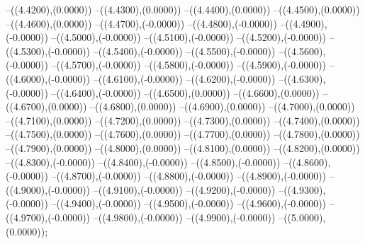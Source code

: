 {	--({\sx*(4.4200)},{\sy*(0.0000)})
	--({\sx*(4.4300)},{\sy*(0.0000)})
	--({\sx*(4.4400)},{\sy*(0.0000)})
	--({\sx*(4.4500)},{\sy*(0.0000)})
	--({\sx*(4.4600)},{\sy*(0.0000)})
	--({\sx*(4.4700)},{\sy*(-0.0000)})
	--({\sx*(4.4800)},{\sy*(-0.0000)})
	--({\sx*(4.4900)},{\sy*(-0.0000)})
	--({\sx*(4.5000)},{\sy*(-0.0000)})
	--({\sx*(4.5100)},{\sy*(-0.0000)})
	--({\sx*(4.5200)},{\sy*(-0.0000)})
	--({\sx*(4.5300)},{\sy*(-0.0000)})
	--({\sx*(4.5400)},{\sy*(-0.0000)})
	--({\sx*(4.5500)},{\sy*(-0.0000)})
	--({\sx*(4.5600)},{\sy*(-0.0000)})
	--({\sx*(4.5700)},{\sy*(-0.0000)})
	--({\sx*(4.5800)},{\sy*(-0.0000)})
	--({\sx*(4.5900)},{\sy*(-0.0000)})
	--({\sx*(4.6000)},{\sy*(-0.0000)})
	--({\sx*(4.6100)},{\sy*(-0.0000)})
	--({\sx*(4.6200)},{\sy*(-0.0000)})
	--({\sx*(4.6300)},{\sy*(-0.0000)})
	--({\sx*(4.6400)},{\sy*(-0.0000)})
	--({\sx*(4.6500)},{\sy*(0.0000)})
	--({\sx*(4.6600)},{\sy*(0.0000)})
	--({\sx*(4.6700)},{\sy*(0.0000)})
	--({\sx*(4.6800)},{\sy*(0.0000)})
	--({\sx*(4.6900)},{\sy*(0.0000)})
	--({\sx*(4.7000)},{\sy*(0.0000)})
	--({\sx*(4.7100)},{\sy*(0.0000)})
	--({\sx*(4.7200)},{\sy*(0.0000)})
	--({\sx*(4.7300)},{\sy*(0.0000)})
	--({\sx*(4.7400)},{\sy*(0.0000)})
	--({\sx*(4.7500)},{\sy*(0.0000)})
	--({\sx*(4.7600)},{\sy*(0.0000)})
	--({\sx*(4.7700)},{\sy*(0.0000)})
	--({\sx*(4.7800)},{\sy*(0.0000)})
	--({\sx*(4.7900)},{\sy*(0.0000)})
	--({\sx*(4.8000)},{\sy*(0.0000)})
	--({\sx*(4.8100)},{\sy*(0.0000)})
	--({\sx*(4.8200)},{\sy*(0.0000)})
	--({\sx*(4.8300)},{\sy*(-0.0000)})
	--({\sx*(4.8400)},{\sy*(-0.0000)})
	--({\sx*(4.8500)},{\sy*(-0.0000)})
	--({\sx*(4.8600)},{\sy*(-0.0000)})
	--({\sx*(4.8700)},{\sy*(-0.0000)})
	--({\sx*(4.8800)},{\sy*(-0.0000)})
	--({\sx*(4.8900)},{\sy*(-0.0000)})
	--({\sx*(4.9000)},{\sy*(-0.0000)})
	--({\sx*(4.9100)},{\sy*(-0.0000)})
	--({\sx*(4.9200)},{\sy*(-0.0000)})
	--({\sx*(4.9300)},{\sy*(-0.0000)})
	--({\sx*(4.9400)},{\sy*(-0.0000)})
	--({\sx*(4.9500)},{\sy*(-0.0000)})
	--({\sx*(4.9600)},{\sy*(-0.0000)})
	--({\sx*(4.9700)},{\sy*(-0.0000)})
	--({\sx*(4.9800)},{\sy*(-0.0000)})
	--({\sx*(4.9900)},{\sy*(-0.0000)})
	--({\sx*(5.0000)},{\sy*(0.0000)});
}
